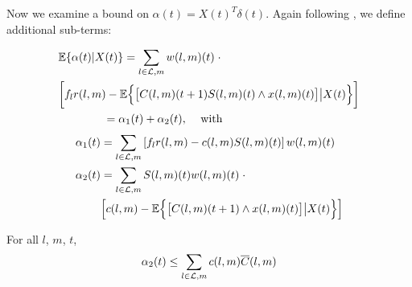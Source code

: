 Now we examine a bound on $\alpha (t) = X(t)^{T}\delta(t) $. Again following \cite{Varaiya2013}, we define additional sub-terms:
\begin{small}
\begin{align} \label{expected_short}
 & \mathbb{E}\{\alpha (t) | X(t)\} = \sum_{l \in \mathcal{L},m} w(l,m)(t) \; \cdot   \\
 \nonumber  & \bigg[ f_l r(l,m) - \mathbb{E}\Big\{  \big[C(l,m)(t+1)S(l,m)(t)\wedge x(l,m)(t)\big] \big| X(t) \Big\}  \bigg]   \\  
 & \qquad \qquad = \alpha_1 (t) + \alpha_2 (t) \text{, \quad with} \nonumber
\end{align}
\begin{align} \label{a1_def}
\alpha_1 (t) &=  \sum_{l \in \mathcal{L},m} \left[ f_l r(l,m) - c(l,m)S(l,m)(t) \right] w(l,m)(t) \\
 \alpha_2 (t) & =  \sum_{l \in \mathcal{L},m}S(l,m)(t)w(l,m)(t)  \; \cdot   \\ 
&\Big[ c(l,m)- \mathbb{E}\Big\{  \big[C  (l,m)(t+1)\wedge x(l,m)(t)\big] \big| X(t)  \Big\}  \Big]  
\end{align}
\end{small}
\begin{Lem} \label{alpha2bound}
For all $l$, $m$, $t$, 
\begin{equation} \label{a2eqn}
\alpha_2 (t) \leq \sum_{l \in \mathcal{L},m} c(l,m)\overline{C} (l,m)
\end{equation}
\end{Lem}
